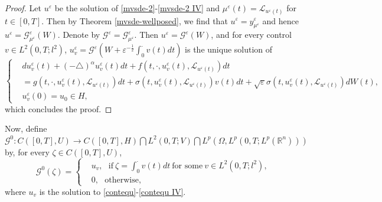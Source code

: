\documentclass[11pt]{article}
\numberwithin{equation}{section}
\theoremstyle{plain}
\begin{document}
\begin{proof}
    Let
    $u^\varepsilon$
    be the solution of
    \eqref{mvsde-2}-\eqref{mvsde-2 IV}
    and   $\mu^\varepsilon(t)  = \mathcal{L}_{u^\varepsilon(t)}$
    for $t\in [0,T]$.
    Then by Theorem \ref{mvsde-wellposed},
    we find that
    $u^\varepsilon
    =y^\varepsilon_{\mu^\varepsilon}$
    and hence
    $
    u^\varepsilon
    =  \mathcal{G}^\varepsilon
    _ {\mu ^\varepsilon} (W)
    $.
    Denote by
    $\mathcal{G}^\varepsilon
    =  \mathcal{G}^\varepsilon
    _ {\mu ^\varepsilon}$.
    Then
    $u^\varepsilon
    =  \mathcal{G}^\varepsilon
    (W)$, and  for every control $v \in L^2(0,T; l^2) $,
    $u_v^\varepsilon
    = \mathcal{G}^\varepsilon \left( W + \varepsilon^{-\frac{1}{2}} \int_{0}^{\cdot} v(t) dt \right)$
    is the unique solution of
    \begin{equation*}
        \left\{
        \begin{aligned}
            & d u_v^\varepsilon (t)
            + (-\triangle)^\alpha u_v^\varepsilon (t) dt
            + f(t, \cdot, u_v^\varepsilon(t), \mathcal{L}_{u^\varepsilon(t)} ) dt
            \\
            & = g(t, \cdot, u_v^\varepsilon(t), \mathcal{L}_{u^\varepsilon(t)} ) dt
            + \sigma(t, u_v^\varepsilon (t), \mathcal{L}_{u^\varepsilon(t)} ) v(t) dt
            + \sqrt{\varepsilon} \sigma(t, u_v^\varepsilon(t), \mathcal{L}_{u^\varepsilon(t)} ) dW(t),
            \\
            & u_v^\varepsilon (0) = u_0 \in H,
        \end{aligned}
        \right.
    \end{equation*}
    which concludes the
    proof.
 \end{proof}






 Now, define
 $\mathcal{G}^0: C([0,T],U)
 \rightarrow
 C([0,T], H) \bigcap L^2(0,T; V)
 \bigcap
 L^p(\Omega, L^p(0,T; L^p(\mathbb{R}^n ) ) )$
 by, for every $\zeta\in C([0,T],U)$,
 \begin{equation}\label{G0}
    \mathcal{G}^0(\zeta)
    = \left\{
    \begin{array} {ll}
        & u_v, \ \ \  \text{if}\  \zeta = \int_{0}^{\cdot} v(t) dt \ \text{for\ some}\  v \in L^2(0,T; l^2),\\
        & 0,\ \ \  \text{otherwise},
    \end{array}
    \right.
 \end{equation}
 where $u_v$ is the solution to \eqref{contequ}-\eqref{contequ IV}.
\end{document}

